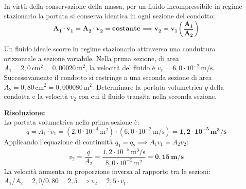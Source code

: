 \documentclass[11pt,a4paper,oneside]{report}
\begin{document}
\begin{leggefisica}
In virt\`u della conservazione della massa, per un fluido incompressibile in regime stazionario la portata si conserva identica in ogni sezione del condotto:
\[
\mathbf{A_1 \cdot v_1 = A_2 \cdot v_2 = \text{costante}} \implies \mathbf{v_2 = v_1 \left(\frac{A_1}{A_2}\right)}
\]
\end{leggefisica}

\begin{problema}
Un fluido ideale scorre in regime stazionario attraverso una conduttura orizzontale a sezione variabile. Nella prima sezione, di area $A_1 = 2{,}0\,\text{cm}^2 = 0{,}00020\,\text{m}^2$, la velocit\`a del fluido \`e $v_1 = 6{,}0 \cdot 10^{-2}\,\text{m/s}$. Successivamente il condotto si restringe a una seconda sezione di area $A_2 = 0{,}80\,\text{cm}^2 = 0{,}000080\,\text{m}^2$.
Determinare la portata volumetrica $q$ della condotta e la velocit\`a $v_2$ con cui il fluido transita nella seconda sezione.

\textbf{Risoluzione:}\\
La portata volumetrica nella prima sezione \`e:
\[
q = A_1 \cdot v_1 = (2{,}0 \cdot 10^{-4}\,\text{m}^2) \cdot (6{,}0 \cdot 10^{-2}\,\text{m/s}) = \mathbf{1{,}2 \cdot 10^{-5}\,\text{m}^3/\text{s}}
\]
Applicando l'equazione di continuit\`a $q_1 = q_2 \implies A_1 v_1 = A_2 v_2$:
\[
v_2 = \frac{q}{A_2} = \frac{1{,}2 \cdot 10^{-5}\,\text{m}^3/\text{s}}{8{,}0 \cdot 10^{-5}\,\text{m}^2} = \mathbf{0{,}15\,\text{m/s}}
\]
La velocit\`a aumenta in proporzione inversa al rapporto tra le sezioni: $A_1 / A_2 = 2{,}0 / 0{,}80 = 2{,}5 \implies v_2 = 2{,}5 \cdot v_1$.
\end{problema}
\end{document}
